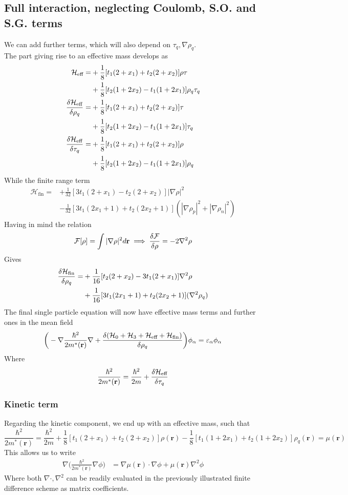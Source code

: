\subsection{Full interaction, neglecting Coulomb, S.O. and S.G. terms}
We can add further terms, which will also depend on $\tau_q, \nabla\rho_q$.
\\The part giving rise to an effective mass develops as 
\begin{align}
    \mathcal H_\text{eff} = &+\frac 1 8 [t_1(2+x_1)+t_2(2+x_2)]\rho\tau  \\&+ \frac 1 8 [t_2(1+2x_2)-t_1(1+2x_1)]\rho_q\tau_q
    \\\fdv{\mathcal H_\text{eff}}{\rho_q} =&+ \frac 1 8 [t_1(2+x_1)+t_2(2+x_2)]\tau \\& + \frac 1 8 [t_2(1+2x_2)-t_1(1+2x_1)]\tau_q
    \\\fdv{\mathcal H_\text{eff}}{\tau_q} =&+ \frac 1 8 [t_1(2+x_1)+t_2(2+x_2)]\rho\\ &+ \frac 1 8 [t_2(1+2x_2)-t_1(1+2x_1)]\rho_q
    \end{align}
While the finite range term 
\begin{align}
    \mathcal H_\text{fin} = &+\frac 1 {32} [3t_1(2+x_1)-t_2(2+x_2)] | \nabla\rho|^2 \\&- \frac 1 {32} [3t_1(2x_1+1)+t_2(2x_2+1)] ( |\nabla\rho_p| ^2 + |\nabla\rho_n|^2) 
\end{align}
Having in mind the relation 
\[\mathcal F [\rho] = \int|\nabla\rho|^2d\mathbf r \implies \fdv {\mathcal F} {\rho} = -2\nabla^2 \rho\]
Gives
\begin{align}
    \fdv{\mathcal H_\text{fin}}{\rho_q} = &+ \frac 1 {16} [t_2(2+x_2)-3t_1(2+x_1)] \nabla^2 \rho \\&+ \frac 1 {16} [3t_1(2x_1+1)+t_2(2x_2+1)] ( \nabla^2 \rho_q )
\end{align}
The final single particle equation will now have effective mass terms and further ones in the mean field
\begin{align}
    \bigg(-\nabla \frac {\hbar^2}{2m^*(\mathbf r)} \nabla + \fdv{(\mathcal{H}_0 + \mathcal{H}_3 + \mathcal{H}_\text{eff} + \mathcal{H}_\text{fin})}{\rho_q} \bigg)\phi_\alpha = \varepsilon_\alpha\phi_\alpha
\end{align}
Where 
\[\frac{\hbar^2}{2m^*(\mathbf r)} = \frac{\hbar^2}{2m} + \fdv{\mathcal{H}_\text{eff}}{\tau_q}\]
\subsubsection{Kinetic term}
Regarding the kinetic component, we end up with an effective mass, such that 
\[\frac{\hbar^2}{2m^*(\mathbf r)} = \frac{\hbar^2}{2m} + \frac 1 8 [t_1(2+x_1)+t_2(2+x_2)]\rho(\mathbf r) - \frac 1 8 [t_1(1+2x_1)+t_2(1+2x_2)]\rho_q(\mathbf r ) = \mu(\mathbf r)\]
This allows us to write
\begin{align}
    \nabla\bigg( \frac{\hbar^2}{2m^*(\mathbf r)} \nabla \phi\bigg)&= \nabla \mu(\mathbf r)\cdot \nabla \phi +\mu(\mathbf r)\nabla^2 \phi 
\end{align}
Where both $\nabla\cdot, \nabla^2$ can be readily evaluated in the previously illustrated finite difference scheme as matrix coefficients.
